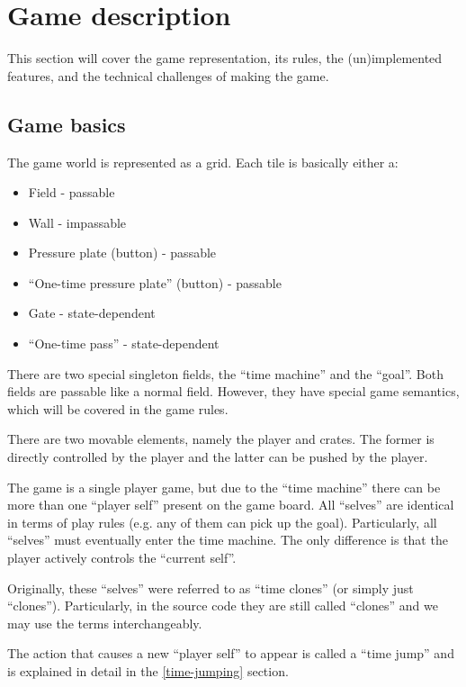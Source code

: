 \section{Game description}

This section will cover the game representation, its rules, the
(un)implemented features, and the technical challenges of making the
game.

\subsection{Game basics}
The game world is represented as a grid.  Each tile is basically
either a:

\begin{itemize}
\item Field - passable
\item Wall - impassable
\item Pressure plate (button) - passable
\item ``One-time pressure plate'' (button) - passable
\item Gate - state-dependent
\item ``One-time pass'' - state-dependent
\end{itemize}

There are two special singleton fields, the ``time machine'' and the
``goal''.  Both fields are passable like a normal field.  However,
they have special game semantics, which will be covered in the game
rules.

There are two movable elements, namely the player and crates.  The
former is directly controlled by the player and the latter can be
pushed by the player.

The game is a single player game, but due to the ``time machine''
there can be more than one ``player self'' present on the game board.
All ``selves'' are identical in terms of play rules (e.g. any of
them can pick up the goal).  Particularly, all ``selves'' must
eventually enter the time machine.  The only difference is that the
player actively controls the ``current self''.

Originally, these ``selves'' were referred to as ``time clones'' (or
simply just ``clones'').  Particularly, in the source code they are
still called ``clones'' and we may use the terms interchangeably.

The action that causes a new ``player self'' to appear is called a
``time jump'' and is explained in detail in the \ref{time-jumping}
section.

